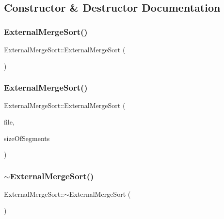 \subsection{Constructor \& Destructor Documentation}
\hypertarget{class_external_merge_sort_a7b6efcd2abbf59a8983f972c52d04650}{}\label{class_external_merge_sort_a7b6efcd2abbf59a8983f972c52d04650} 
\subsubsection{\texorpdfstring{External\+Merge\+Sort()}{ExternalMergeSort()}\hspace{0.1cm}{\footnotesize\ttfamily [1/2]}}
{\footnotesize\ttfamily External\+Merge\+Sort\+::\+External\+Merge\+Sort (\begin{DoxyParamCaption}{ }\end{DoxyParamCaption})}

\hypertarget{class_external_merge_sort_a37df182916b341d5466f2fff0d50dfed}{}\label{class_external_merge_sort_a37df182916b341d5466f2fff0d50dfed} 
\subsubsection{\texorpdfstring{External\+Merge\+Sort()}{ExternalMergeSort()}\hspace{0.1cm}{\footnotesize\ttfamily [2/2]}}
{\footnotesize\ttfamily External\+Merge\+Sort\+::\+External\+Merge\+Sort (\begin{DoxyParamCaption}\item[{\hyperlink{class_file_manager}{File\+Manager} $\ast$}]{file,  }\item[{long long}]{size\+Of\+Segments }\end{DoxyParamCaption})}

\hypertarget{class_external_merge_sort_adfee7073120e0ae832c96977440b2fb4}{}\label{class_external_merge_sort_adfee7073120e0ae832c96977440b2fb4} 
\subsubsection{\texorpdfstring{$\sim$\+External\+Merge\+Sort()}{~ExternalMergeSort()}}
{\footnotesize\ttfamily External\+Merge\+Sort\+::$\sim$\+External\+Merge\+Sort (\begin{DoxyParamCaption}{ }\end{DoxyParamCaption})\hspace{0.3cm}{\ttfamily [virtual]}}



